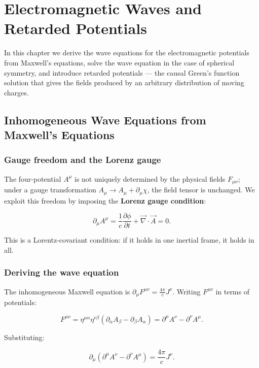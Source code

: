 \chapter{Electromagnetic Waves and Retarded Potentials}

In this chapter we derive the wave equations for the electromagnetic potentials from Maxwell's equations, solve the wave equation in the case of spherical symmetry, and introduce retarded potentials --- the causal Green's function solution that gives the fields produced by an arbitrary distribution of moving charges.

\section{Inhomogeneous Wave Equations from Maxwell's Equations}

\subsection{Gauge freedom and the Lorenz gauge}

The four-potential $A^\mu$ is not uniquely determined by the physical fields $F_{\mu\nu}$; under a gauge transformation $A_\mu \to A_\mu + \partial_\mu\chi$, the field tensor is unchanged. We exploit this freedom by imposing the \textbf{Lorenz gauge condition}:

\begin{equation}
\boxed{\partial_\mu A^\mu = \frac{1}{c}\frac{\partial\phi}{\partial t} + \vec{\nabla}\cdot\vec{A} = 0.}
\end{equation}

This is a Lorentz-covariant condition: if it holds in one inertial frame, it holds in all.

\subsection{Deriving the wave equation}

The inhomogeneous Maxwell equation is $\partial_\mu F^{\mu\nu} = \frac{4\pi}{c}J^\nu$. Writing $F^{\mu\nu}$ in terms of potentials:

\begin{equation}
F^{\mu\nu} = \eta^{\mu\alpha}\eta^{\nu\beta}(\partial_\alpha A_\beta - \partial_\beta A_\alpha) = \partial^\mu A^\nu - \partial^\nu A^\mu.
\end{equation}

Substituting:

\begin{equation}
\partial_\mu(\partial^\mu A^\nu - \partial^\nu A^\mu) = \frac{4\pi}{c}J^\nu.
\end{equation}


